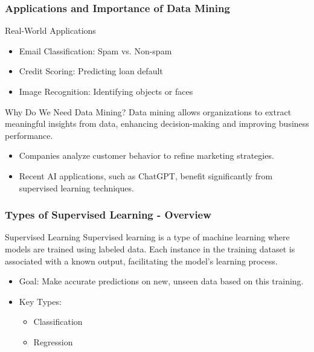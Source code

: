 \documentclass[aspectratio=169]{beamer}
\begin{document}
\begin{frame}[fragile]
    \frametitle{Applications and Importance of Data Mining}
    \begin{block}{Real-World Applications}
        \begin{itemize}
            \item Email Classification: Spam vs. Non-spam
            \item Credit Scoring: Predicting loan default
            \item Image Recognition: Identifying objects or faces
        \end{itemize}
    \end{block}
    \begin{block}{Why Do We Need Data Mining?}
        Data mining allows organizations to extract meaningful insights from data, enhancing decision-making and improving business performance.
    \end{block}
    \begin{itemize}
        \item Companies analyze customer behavior to refine marketing strategies.
        \item Recent AI applications, such as ChatGPT, benefit significantly from supervised learning techniques.
    \end{itemize}
\end{frame}

\begin{frame}[fragile]
    \frametitle{Types of Supervised Learning - Overview}
    \begin{block}{Supervised Learning}
        Supervised learning is a type of machine learning where models are trained using labeled data. Each instance in the training dataset is associated with a known output, facilitating the model’s learning process. 
    \end{block}
    
    \begin{itemize}
        \item Goal: Make accurate predictions on new, unseen data based on this training.
        \item Key Types: 
            \begin{itemize}
                \item Classification
                \item Regression
            \end{itemize}
    \end{itemize}
\end{frame}
\end{document}
